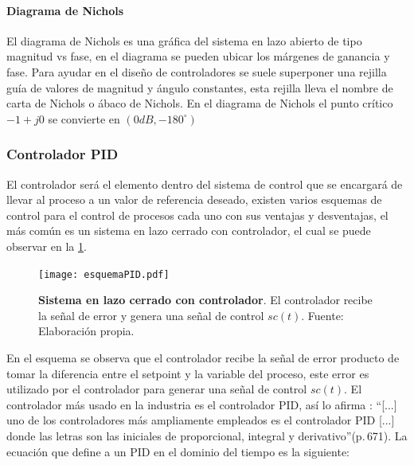             \paragraph{Diagrama de Nichols}
                
                El diagrama de Nichols es una gráfica del sistema en lazo abierto de tipo magnitud vs fase, en el diagrama se pueden ubicar los márgenes de ganancia y fase. Para ayudar en el diseño de controladores se suele superponer una rejilla guía de valores de magnitud y ángulo constantes, esta rejilla lleva el nombre de carta de Nichols o ábaco de Nichols. En el diagrama de Nichols el punto crítico $-1 + j0$ se convierte en $(0dB, -180^\circ)$

                \clearpage

        \subsubsection{Controlador PID}

            El controlador será el elemento dentro del sistema de control que se encargará de llevar al proceso a un valor de referencia deseado, existen varios esquemas de control para el control de procesos cada uno con sus ventajas y desventajas, el más común es un sistema en lazo cerrado con controlador, el cual se puede observar en la \cref{fig:esquemaPID}.

            \begin{figure}[htb]
                \centering
                \texttt{[image: esquemaPID.pdf]}
                \caption[Ejemplo de un sistema en lazo cerrado con controlador]{\textbf{Sistema en lazo cerrado con controlador}. El controlador recibe la señal de error y genera una señal de control $sc(t)$. Fuente: Elaboración propia.} 
                \label{fig:esquemaPID}
            \end{figure}

            En el esquema se observa que el controlador recibe la señal de error producto de tomar la diferencia entre el setpoint y la variable del proceso, este error es utilizado por el controlador para generar una señal de control $sc(t)$. El controlador más usado en la industria es el controlador PID, así lo afirma \textcite{kuo1996sistemas}: \enquote{[...] uno de los controladores más ampliamente empleados es el controlador PID [...] donde las letras son las iniciales de proporcional, integral y derivativo}(p.$\,$671). La ecuación que define a un PID en el dominio del tiempo es la siguiente:

